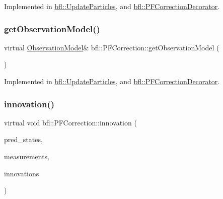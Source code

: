 Implemented in \mbox{\hyperlink{classbfl_1_1UpdateParticles_aa589f7fab7cd83f310c9dc17ee169dec}{bfl\+::\+Update\+Particles}}, and \mbox{\hyperlink{classbfl_1_1PFCorrectionDecorator_abb5ab0ef4245b67be546360a54416498}{bfl\+::\+P\+F\+Correction\+Decorator}}.

\mbox{\label{classbfl_1_1PFCorrection_a3bc4010f306825d69014bee53cd262ad}} 
\subsubsection{\texorpdfstring{get\+Observation\+Model()}{getObservationModel()}}
{\footnotesize\ttfamily virtual \mbox{\hyperlink{classbfl_1_1ObservationModel}{Observation\+Model}}\& bfl\+::\+P\+F\+Correction\+::get\+Observation\+Model (\begin{DoxyParamCaption}{ }\end{DoxyParamCaption})\hspace{0.3cm}{\ttfamily [pure virtual]}}



Implemented in \mbox{\hyperlink{classbfl_1_1UpdateParticles_a673781f8cadbd148cb9a67a3f8532b37}{bfl\+::\+Update\+Particles}}, and \mbox{\hyperlink{classbfl_1_1PFCorrectionDecorator_a7bafd701e4a97efc55ba7fea6125cc7f}{bfl\+::\+P\+F\+Correction\+Decorator}}.

\mbox{\label{classbfl_1_1PFCorrection_a22e803c147f8fb45b7b98c854a947057}} 
\subsubsection{\texorpdfstring{innovation()}{innovation()}}
{\footnotesize\ttfamily virtual void bfl\+::\+P\+F\+Correction\+::innovation (\begin{DoxyParamCaption}\item[{const Eigen\+::\+Ref$<$ const Eigen\+::\+Matrix\+Xf $>$ \&}]{pred\+\_\+states,  }\item[{const Eigen\+::\+Ref$<$ const Eigen\+::\+Matrix\+Xf $>$ \&}]{measurements,  }\item[{Eigen\+::\+Ref$<$ Eigen\+::\+Matrix\+Xf $>$}]{innovations }\end{DoxyParamCaption})\hspace{0.3cm}{\ttfamily [pure virtual]}}



